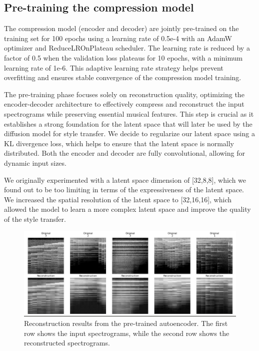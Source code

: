 \subsection{Pre-training the compression model}

The compression model (encoder and decoder) are jointly pre-trained on the training set for 100 epochs using a learning rate of 0.5e-4 with an AdamW optimizer and ReduceLROnPlateau scheduler. The learning rate is reduced by a factor of 0.5 when the validation loss plateaus for 10 epochs, with a minimum learning rate of 1e-6. This adaptive learning rate strategy helps prevent overfitting and ensures stable convergence of the compression model training.

The pre-training phase focuses solely on reconstruction quality, optimizing the encoder-decoder architecture to effectively compress and reconstruct the input spectrograms while preserving essential musical features. This step is crucial as it establishes a strong foundation for the latent space that will later be used by the diffusion model for style transfer. We decide to regularize our latent space using a KL divergence loss, which helps to ensure that the latent space is normally distributed. Both the encoder and decoder are fully convolutional, allowing for dynamic input sizes.

We originally experimented with a latent space dimension of [32,8,8], which we found out to be too limiting in terms of the expressiveness of the latent space. We increased the spatial resolution of the latent space to [32,16,16], which allowed the model to learn a more complex latent space and improve the quality of the style transfer.

\begin{figure}[h]
    \centering
    \includegraphics[width=\textwidth]{figures/reconstruction.jpeg}
    \caption{Reconstruction results from the pre-trained autoencoder. The first row shows the input spectrograms, while the second row shows the reconstructed spectrograms. }
    \label{fig:reconstruction}
\end{figure}


